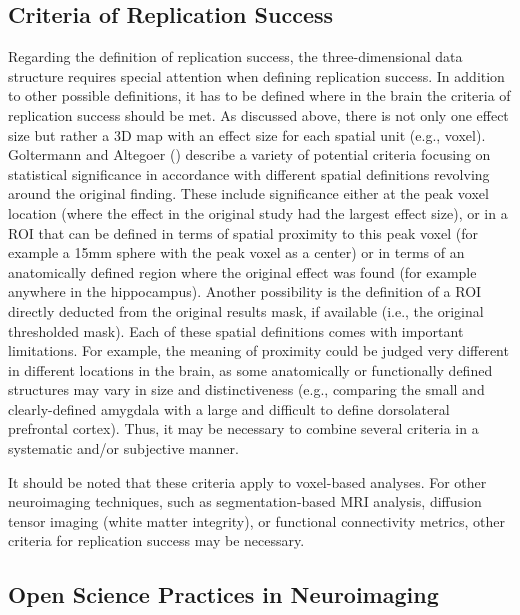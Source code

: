 \documentclass[
  letterpaper,
  DIV=11,
  openany,
  fontsize=12pt,
  parskip=half,
  headings=big,
  numbers=noenddot,
  titlepage=false]{scrreprt}
\begin{document}
\subsection{Criteria of Replication
Success}\label{criteria-of-replication-success}

Regarding the definition of replication success, the three-dimensional
data structure requires special attention when defining replication
success. In addition to other possible definitions, it has to be defined
where in the brain the criteria of replication success should be met. As
discussed above, there is not only one effect size but rather a 3D map
with an effect size for each spatial unit (e.g., voxel). Goltermann and
Altegoer () describe a
variety of potential criteria focusing on statistical significance in
accordance with different spatial definitions revolving around the
original finding. These include significance either at the peak voxel
location (where the effect in the original study had the largest effect
size), or in a ROI that can be defined in terms of spatial proximity to
this peak voxel (for example a 15mm sphere with the peak voxel as a
center) or in terms of an anatomically defined region where the original
effect was found (for example anywhere in the hippocampus). Another
possibility is the definition of a ROI directly deducted from the
original results mask, if available (i.e., the original thresholded
mask). Each of these spatial definitions comes with important
limitations. For example, the meaning of proximity could be judged very
different in different locations in the brain, as some anatomically or
functionally defined structures may vary in size and distinctiveness
(e.g., comparing the small and clearly-defined amygdala with a large and
difficult to define dorsolateral prefrontal cortex). Thus, it may be
necessary to combine several criteria in a systematic and/or subjective
manner.

It should be noted that these criteria apply to voxel-based analyses.
For other neuroimaging techniques, such as segmentation-based MRI
analysis, diffusion tensor imaging (white matter integrity), or
functional connectivity metrics, other criteria for replication success
may be necessary.

\subsection{Open Science Practices in
Neuroimaging}\label{open-science-practices-in-neuroimaging}
\end{document}
